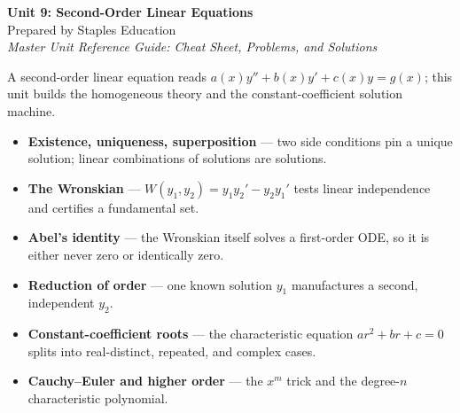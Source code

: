 




\begin{center}
    {\LARGE \bfseries Unit 9: Second-Order Linear Equations}\\[6pt]
    {\large Prepared by Staples Education}\\[4pt]
    {\itshape Master Unit Reference Guide: Cheat Sheet, Problems, and Solutions}
\end{center}

\vspace{0.4em}

\tableofcontents

\vspace{0.4em}

\begin{topicsbox}
A second-order linear equation reads
$a(x)y'' + b(x)y' + c(x)y = g(x)$; this unit builds the homogeneous theory and the
constant-coefficient solution machine.
\begin{itemize}[leftmargin=1.4em, itemsep=3pt]
    \item \textbf{Existence, uniqueness, superposition} --- two side conditions
          pin a unique solution; linear combinations of solutions are solutions.
    \item \textbf{The Wronskian} --- $W(y_1,y_2)=y_1y_2'-y_2y_1'$ tests linear
          independence and certifies a fundamental set.
    \item \textbf{Abel's identity} --- the Wronskian itself solves a first-order
          ODE, so it is either never zero or identically zero.
    \item \textbf{Reduction of order} --- one known solution $y_1$ manufactures a
          second, independent $y_2$.
    \item \textbf{Constant-coefficient roots} --- the characteristic equation
          $ar^2+br+c=0$ splits into real-distinct, repeated, and complex cases.
    \item \textbf{Cauchy--Euler and higher order} --- the $x^m$ trick and the
          degree-$n$ characteristic polynomial.
\end{itemize}
\end{topicsbox}

